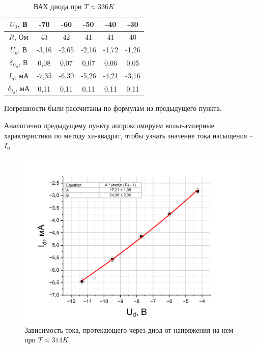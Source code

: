 \documentclass[a4paper,12pt]{article}
\begin{document}
\begin{table}[h!]
\centering
\caption{ВАХ диода при $T \approx 336 K$}
\begin{tabular}{|c|c|c|c|c|c|}
\hline
$U_0$, В & -70 & -60 & -50 & -40 & -30 \\ \hline
$R$, Ом & 43 & 42 & 41 & 41 & 40 \\ \hline
$U_d$, В & -3,16 & -2,65 & -2,16 & -1,72 & -1,26 \\ \hline
$\delta_{U_d}$, В & 0,08 & 0,07 & 0,07 & 0,06 & 0,05 \\ \hline
$I_d$, мА & -7,35 & -6,30 & -5,26 & -4,21 & -3,16 \\ \hline
$\delta_{I_d}$, мА & 0,11 & 0,11 & 0,11 & 0,11 & 0,11 \\ \hline
\end{tabular}
\end{table}

Погрешности были рассчитаны по формулам из предыдущего пункта.

Аналогично предыдущему пункту аппроксимируем вольт-амперные характеристики по методу хи-квадрат, чтобы узнать значение тока насыщения -- $I_0$

\newpage

\begin{figure}[h!]
	\centering
	\includegraphics[width=0.8\linewidth]{reverse_T_1}
	\caption{Зависимость тока, протекающего через диод от напряжения на нем при $T \approx 314K$}
\end{figure}
\end{document}
